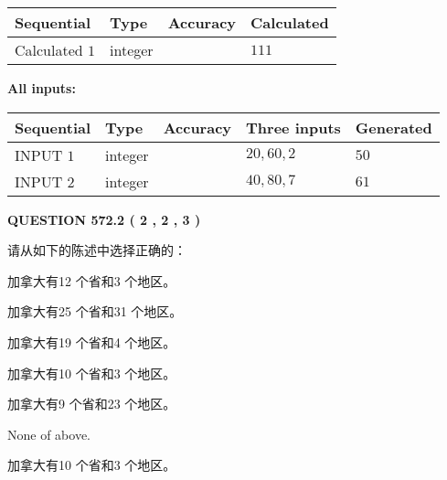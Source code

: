 \documentclass{ctexart}
\begin{document}
  
\noindent\begin{tabular}{|l|l|l|l|}
\hline
 Sequential & Type & Accuracy & Calculated \\ 
\hline
 
 
  Calculated $  1 $ & integer &  & 
  $ 111 $ 
 \\  \hline  
 \end{tabular}
   
   
   
   
\noindent\vspace{0.1in}\hspace{-0.08in} {\textbf{\Large{All inputs: }}}
   
   
  
  
\noindent\begin{tabular}{|l|l|l|l|l|}
\hline
 Sequential & Type & Accuracy & Three inputs & Generated \\ 
\hline
 
 
  INPUT $  1 $ & integer &  & $
 20
 , 
 60
 , 
 2
 $ & $ 50 $ 
 \\  \hline  
 
 
  INPUT $  2 $ & integer &  & $
 40
 , 
 80
 , 
 7
 $ & $ 61 $ 
 \\  \hline  
 \end{tabular}
   
   
  
\vspace{0.2in}
  
{\textbf{\Large{QUESTION
572.2 
 ( 2 , 2 , 3 )
}}}
  
  
请从如下的陈述中选择正确的：
 
 
加拿大有12 个省和3 个地区。
 
 
加拿大有25 个省和31 个地区。
 
 
加拿大有19 个省和4 个地区。
 
 
加拿大有10 个省和3 个地区。
 
 
加拿大有9 个省和23 个地区。
 
 
 None of above.
 
 
\noindent{}
 
 
加拿大有10 个省和3 个地区。
 
 
\noindent{}
 
\end{document}
